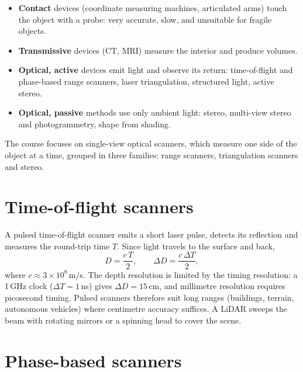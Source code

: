 \begin{itemize}
  \item \textbf{Contact} devices (coordinate measuring machines, articulated arms) touch the object
  with a probe: very accurate, slow, and unsuitable for fragile objects.
  \item \textbf{Transmissive} devices (CT, MRI) measure the interior and produce volumes.
  \item \textbf{Optical, active} devices emit light and observe its return: time-of-flight and
  phase-based range scanners, laser triangulation, structured light, active stereo.
  \item \textbf{Optical, passive} methods use only ambient light: stereo, multi-view stereo and
  photogrammetry, shape from shading.
\end{itemize}
The course focuses on single-view optical scanners, which measure one side of the object at a time,
grouped in three families: range scanners, triangulation scanners and stereo.

\section{Time-of-flight scanners}

A pulsed time-of-flight scanner emits a short laser pulse, detects its reflection and measures the
round-trip time $T$. Since light travels to the surface and back,
\begin{equation}
D=\frac{c\,T}{2},\qquad \Delta D=\frac{c\,\Delta T}{2},
\end{equation}
where $c\approx3\times10^8$\,m/s. The depth resolution is limited by the timing resolution: a
1\,GHz clock ($\Delta T=1$\,ns) gives $\Delta D=15$\,cm, and millimetre resolution requires
picosecond timing. Pulsed scanners therefore suit long ranges (buildings, terrain, autonomous
vehicles) where centimetre accuracy suffices. A LiDAR sweeps the beam with rotating mirrors or a
spinning head to cover the scene.

\section{Phase-based scanners}

